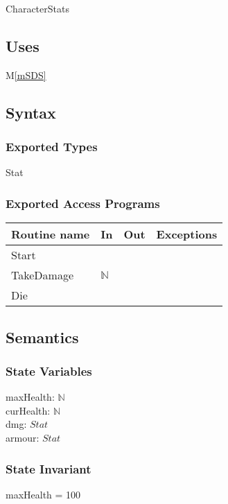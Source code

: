 \documentclass[12pt]{article}
\newcommand{\mref}[1]{M\ref{#1}}
\begin{document}
CharacterStats

\subsection* {Uses}

\mref{mSDS}

\subsection* {Syntax}

\subsubsection* {Exported Types}

Stat

\subsubsection* {Exported Access Programs}

\begin{tabular}{| l | l | l | l |}
\hline
\textbf{Routine name} & \textbf{In} & \textbf{Out} & \textbf{Exceptions}\\
\hline
Start & ~ & ~  & ~\\
TakeDamage & $\mathbb{N}$  & ~ & ~\\
Die & ~  & ~ & ~\\
\hline
\end{tabular}

\subsection* {Semantics}

\subsubsection* {State Variables}

maxHealth: $\mathbb{N}$ \\
curHealth: $\mathbb{N}$ \\
dmg: $Stat$\\
armour: $Stat$\\

\subsubsection* {State Invariant}

maxHealth = 100
\end{document}
